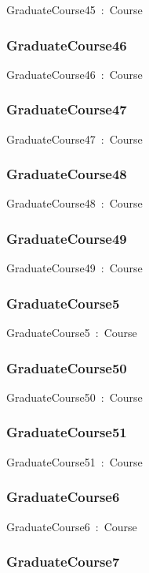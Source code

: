 \documentclass{article}
\begin{document}
GraduateCourse45~:~Course

\subsubsection*{GraduateCourse46}

GraduateCourse46~:~Course

\subsubsection*{GraduateCourse47}

GraduateCourse47~:~Course

\subsubsection*{GraduateCourse48}

GraduateCourse48~:~Course

\subsubsection*{GraduateCourse49}

GraduateCourse49~:~Course

\subsubsection*{GraduateCourse5}

GraduateCourse5~:~Course

\subsubsection*{GraduateCourse50}

GraduateCourse50~:~Course

\subsubsection*{GraduateCourse51}

GraduateCourse51~:~Course

\subsubsection*{GraduateCourse6}

GraduateCourse6~:~Course

\subsubsection*{GraduateCourse7}
\end{document}
